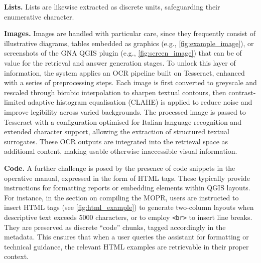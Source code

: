 \begin{spacing}{1.5}
\textbf{Lists. }Lists are likewise extracted as discrete units, safeguarding their enumerative character. 

\textbf{Images. }Images are handled with particular care, since they frequently consist of illustrative diagrams, tables embedded as graphics (e.g., \autoref{fig:example_image}), or screenshots of the GNA QGIS plugin (e.g., \autoref{fig:screen_image}) that can be of value for the retrieval and answer generation stages. To unlock this layer of information, the system applies an OCR pipeline built on Tesseract, enhanced with a series of preprocessing steps. Each image is first converted to greyscale and rescaled through bicubic interpolation to sharpen textual contours, then contrast-limited adaptive histogram equalisation (CLAHE) is applied to reduce noise and improve legibility across varied backgrounds. The processed image is passed to Tesseract with a configuration optimised for Italian language recognition and extended character support, allowing the extraction of structured textual surrogates. These OCR outputs are integrated into the retrieval space as additional content, making usable otherwise inaccessible visual information.

\textbf{Code. }A further challenge is posed by the presence of code snippets in the operative manual, expressed in the form of HTML tags. These typically provide instructions for formatting reports or embedding elements within QGIS layouts. For instance, in the section on compiling the MOPR, users are instructed to insert HTML tags (see \autoref{fig:html_example}) to generate two-column layouts when descriptive text exceeds 5000 characters, or to employ \texttt{<br>} to insert line breaks. They are preserved as discrete ``code'' chunks, tagged accordingly in the metadata. This ensures that when a user queries the assistant for formatting or technical guidance, the relevant HTML examples are retrievable in their proper context.\\


\end{spacing}

